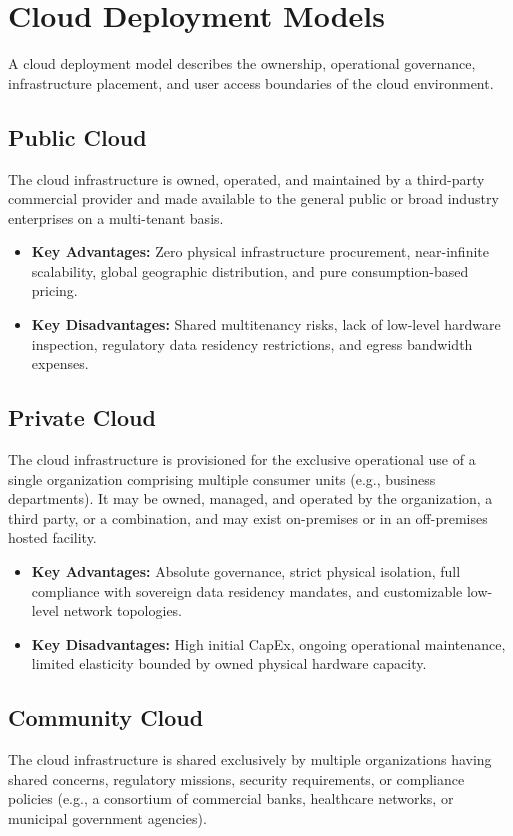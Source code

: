 \section{Cloud Deployment Models}
\label{sec:cloud_deployment_models}

A cloud deployment model describes the ownership, operational governance, infrastructure placement, and user access boundaries of the cloud environment.

\subsection{Public Cloud}
The cloud infrastructure is owned, operated, and maintained by a third-party commercial provider and made available to the general public or broad industry enterprises on a multi-tenant basis.
\begin{itemize}
    \item \textbf{Key Advantages:} Zero physical infrastructure procurement, near-infinite scalability, global geographic distribution, and pure consumption-based pricing.
    \item \textbf{Key Disadvantages:} Shared multitenancy risks, lack of low-level hardware inspection, regulatory data residency restrictions, and egress bandwidth expenses.
\end{itemize}

\subsection{Private Cloud}
The cloud infrastructure is provisioned for the exclusive operational use of a single organization comprising multiple consumer units (e.g., business departments). It may be owned, managed, and operated by the organization, a third party, or a combination, and may exist on-premises or in an off-premises hosted facility.
\begin{itemize}
    \item \textbf{Key Advantages:} Absolute governance, strict physical isolation, full compliance with sovereign data residency mandates, and customizable low-level network topologies.
    \item \textbf{Key Disadvantages:} High initial CapEx, ongoing operational maintenance, limited elasticity bounded by owned physical hardware capacity.
\end{itemize}

\subsection{Community Cloud}
The cloud infrastructure is shared exclusively by multiple organizations having shared concerns, regulatory missions, security requirements, or compliance policies (e.g., a consortium of commercial banks, healthcare networks, or municipal government agencies).

